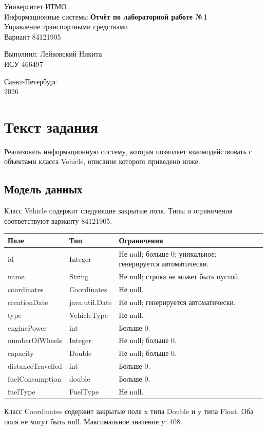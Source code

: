 \documentclass[14pt,a4paper]{extarticle}
\begin{document}
\begin{titlepage}
\begin{center}
Университет ИТМО\\
Информационные системы
\vfill
\textbf{Отчёт по лабораторной работе №1}\\[10pt]
Управление транспортными средствами\\
Вариант 84121905
\end{center}
\vfill
\begin{flushright}
Выполнил: Лейковский Никита\\
ИСУ 466497
\end{flushright}
\vfill
\begin{center}Санкт-Петербург\\2026\end{center}
\end{titlepage}
\setcounter{page}{2}
\tableofcontents
\clearpage
\section{Текст задания}
Реализовать информационную систему, которая позволяет взаимодействовать с объектами класса Vehicle, описание которого приведено ниже.

\subsection*{Модель данных}
Класс Vehicle содержит следующие закрытые поля. Типы и ограничения соответствуют варианту 84121905.

{
\begin{longtable}{|p{}|p{}|p{}|}
\hline
Поле & Тип & Ограничения\\\hline
\endhead
id & Integer & Не null; больше 0; уникальное; генерируется автоматически.\\\hline
name & String & Не null; строка не может быть пустой.\\\hline
coordinates & Coordinates & Не null.\\\hline
creationDate & java.util.Date & Не null; генерируется автоматически.\\\hline
type & VehicleType & Не null.\\\hline
enginePower & int & Больше 0.\\\hline
numberOfWheels & Integer & Не null; больше 0.\\\hline
capacity & Double & Не null; больше 0.\\\hline
distanceTravelled & int & Больше 0.\\\hline
fuelConsumption & double & Больше 0.\\\hline
fuelType & FuelType & Не null.\\\hline
\end{longtable}}
Класс Coordinates содержит закрытые поля x типа Double и y типа Float. Оба поля не могут быть null. Максимальное значение y: 408.
\end{document}
